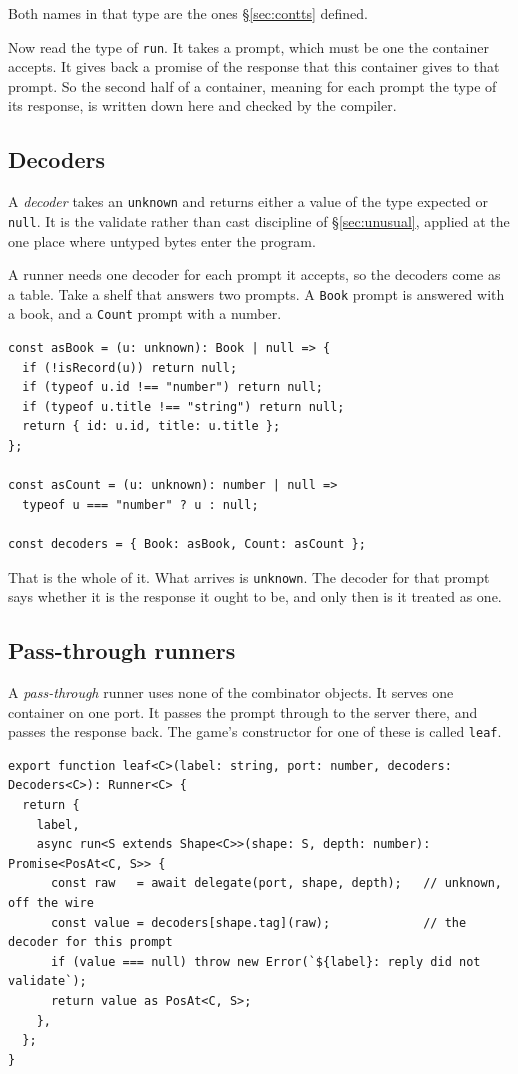 \documentclass[11pt,a4paper]{article}
\begin{document}
Both names in that type are the ones \S\ref{sec:contts} defined.

Now read the type of \texttt{run}. It takes a prompt, which must be one the container accepts. It
gives back a promise of the response that this container gives to that prompt. So the second half of
a container, meaning for each prompt the type of its response, is written down here and checked by the
compiler.

\subsection{Decoders}
\label{sec:decoders}

A \emph{decoder} takes an \texttt{unknown} and returns either a value of the type expected or
\texttt{null}. It is the validate rather than cast discipline of \S\ref{sec:unusual}, applied at
the one place where untyped bytes enter the program.

A runner needs one decoder for each prompt it accepts, so the decoders come as a table. Take a shelf
that answers two prompts. A \texttt{Book} prompt is answered with a book, and a \texttt{Count}
prompt with a number.

\begin{lstlisting}[language=TS]
const asBook = (u: unknown): Book | null => {
  if (!isRecord(u)) return null;
  if (typeof u.id !== "number") return null;
  if (typeof u.title !== "string") return null;
  return { id: u.id, title: u.title };
};

const asCount = (u: unknown): number | null =>
  typeof u === "number" ? u : null;

const decoders = { Book: asBook, Count: asCount };
\end{lstlisting}

That is the whole of it. What arrives is \texttt{unknown}. The decoder for that prompt says whether
it is the response it ought to be, and only then is it treated as one.

\subsection{Pass-through runners}

A \emph{pass-through} runner uses none of the combinator objects. It serves one container on one
port. It passes the prompt through to the server there, and passes the response back. The game's
constructor for one of these is called \texttt{leaf}.

\begin{lstlisting}[language=TS]
export function leaf<C>(label: string, port: number, decoders: Decoders<C>): Runner<C> {
  return {
    label,
    async run<S extends Shape<C>>(shape: S, depth: number): Promise<PosAt<C, S>> {
      const raw   = await delegate(port, shape, depth);   // unknown, off the wire
      const value = decoders[shape.tag](raw);             // the decoder for this prompt
      if (value === null) throw new Error(`${label}: reply did not validate`);
      return value as PosAt<C, S>;
    },
  };
}
\end{lstlisting}
\end{document}
